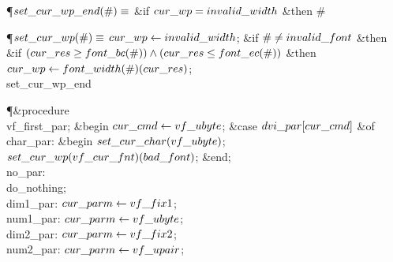 \Y\P\D {}$\\{set\_cur\_wp\_end}(\#)\S$\1\6
\&{if} $\\{cur\_wp}=\\{invalid\_width}$ \1\&{then}\5
$\#$\2\2\par
\P\D {}$\\{set\_cur\_wp}(\#)\S$%
\6
$\\{cur\_wp}\K\\{invalid\_width}$;\6
\&{if} $\#\I\\{invalid\_font}$ \1\&{then}\6
\&{if} $(\\{cur\_res}\G\\{font\_bc}(\#))\W(\\{cur\_res}\L\\{font\_ec}(\#))$ \1%
\&{then}\5
$\\{cur\_wp}\K\\{font\_width}(\#)(\\{cur\_res})$;\2\2\6
\\{set\_cur\_wp\_end}\par
\Y\P\4\&{procedure}\1\  \\{vf\_first\_par};\2\6
\&{begin} $\\{cur\_cmd}\K\\{vf\_ubyte}$;\6
\&{case} $\\{dvi\_par}[\\{cur\_cmd}]$ \1\&{of}\6
\4\\{char\_par}: \&{begin} $\\{set\_cur\_char}(\\{vf\_ubyte})$;\5
$\\{set\_cur\_wp}(\\{vf\_cur\_fnt})(\\{bad\_font})$;\6
\&{end};\6
\4\\{no\_par}: \\{do\_nothing};\6
\4\\{dim1\_par}: $\\{cur\_parm}\K\\{vf\_fix1}$;\6
\4\\{num1\_par}: $\\{cur\_parm}\K\\{vf\_ubyte}$;\6
\4\\{dim2\_par}: $\\{cur\_parm}\K\\{vf\_fix2}$;\6
\4\\{num2\_par}: $\\{cur\_parm}\K\\{vf\_upair}$;\6
